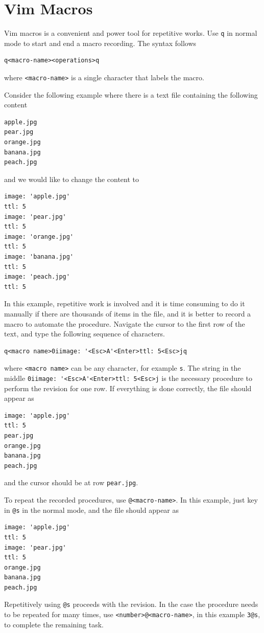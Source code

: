 \section{Vim Macros}

Vim macros is a convenient and power tool for repetitive works. Use \verb|q| in normal mode to start and end a macro recording. The syntax follows
\begin{lstlisting}
q<macro-name><operations>q
\end{lstlisting}
where \verb|<macro-name>| is a single character that labels the macro.

Consider the following example where there is a text file containing the following content
\begin{lstlisting}
apple.jpg
pear.jpg
orange.jpg
banana.jpg
peach.jpg
\end{lstlisting}
and we would like to change the content to
\begin{lstlisting}
image: 'apple.jpg'
ttl: 5
image: 'pear.jpg'
ttl: 5
image: 'orange.jpg'
ttl: 5
image: 'banana.jpg'
ttl: 5
image: 'peach.jpg'
ttl: 5
\end{lstlisting}

In this example, repetitive work is involved and it is time consuming to do it manually if there are thousands of items in the file, and it is better to record a macro to automate the procedure. Navigate the cursor to the first row of the text, and type the following sequence of characters.
\begin{lstlisting}
q<macro name>0iimage: '<Esc>A'<Enter>ttl: 5<Esc>jq
\end{lstlisting}
where \verb|<macro name>| can be any character, for example \verb|s|. The string in the middle \verb|0iimage: '<Esc>A'<Enter>ttl: 5<Esc>j| is the necessary procedure to perform the revision for one row. If everything is done correctly, the file should appear as
\begin{lstlisting}
image: 'apple.jpg'
ttl: 5
pear.jpg
orange.jpg
banana.jpg
peach.jpg
\end{lstlisting}
and the cursor should be at row \verb|pear.jpg|.

To repeat the recorded procedures, use \verb|@<macro-name>|. In this example, just key in \verb|@s| in the normal mode, and the file should appear as
\begin{lstlisting}
image: 'apple.jpg'
ttl: 5
image: 'pear.jpg'
ttl: 5
orange.jpg
banana.jpg
peach.jpg
\end{lstlisting}

Repetitively using \verb|@s| proceeds with the revision. In the case the procedure needs to be repeated for many times, use \verb|<number>@<macro-name>|, in this example \verb|3@s|, to complete the remaining task.

